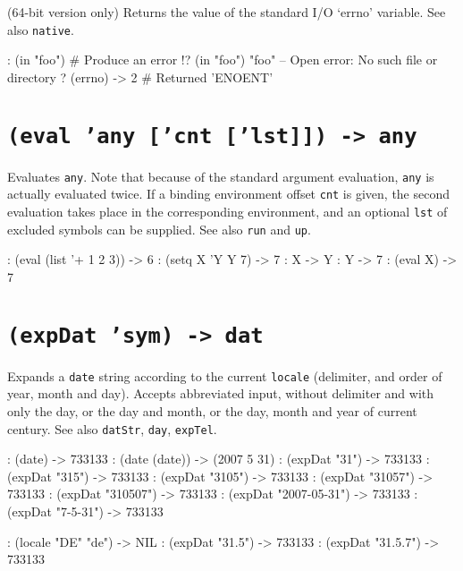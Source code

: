 (64-bit version only) Returns the value of the standard I/O `errno'
variable. See also \texttt{native}.


\begin{wideverbatim}
: (in "foo")                           # Produce an error
!? (in "foo")
"foo" -- Open error: No such file or directory
? (errno)
-> 2                                   # Returned 'ENOENT'
\end{wideverbatim}

 
\section*{\texttt{(eval 'any ['cnt ['lst]]) -> any}}
\label{sec:func-ref-E-(eval 'any ['cnt ['lst]]) -> any}


Evaluates \texttt{any}. Note that because of the standard argument evaluation,
\texttt{any} is actually evaluated twice. If a binding environment offset \texttt{cnt}
is given, the second evaluation takes place in the corresponding
environment, and an optional \texttt{lst} of excluded symbols can be supplied.
See also \texttt{run} and \texttt{up}.


\begin{wideverbatim}
: (eval (list '+ 1 2 3))
-> 6
: (setq X 'Y  Y 7)
-> 7
: X
-> Y
: Y
-> 7
: (eval X)
-> 7
\end{wideverbatim}

 
\section*{\texttt{(expDat 'sym) -> dat}}
\label{sec:func-ref-E-(expDat 'sym) -> dat}


Expands a \texttt{date} string according to the current \texttt{locale} (delimiter,
and order of year, month and day). Accepts abbreviated input, without
delimiter and with only the day, or the day and month, or the day, month
and year of current century. See also \texttt{datStr}, \texttt{day}, \texttt{expTel}.


\begin{wideverbatim}
: (date)
-> 733133
: (date (date))
-> (2007 5 31)
: (expDat "31")
-> 733133
: (expDat "315")
-> 733133
: (expDat "3105")
-> 733133
: (expDat "31057")
-> 733133
: (expDat "310507")
-> 733133
: (expDat "2007-05-31")
-> 733133
: (expDat "7-5-31")
-> 733133

: (locale "DE" "de")
-> NIL
: (expDat "31.5")
-> 733133
: (expDat "31.5.7")
-> 733133
\end{wideverbatim}

